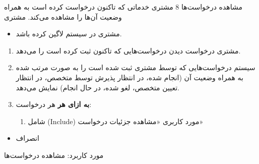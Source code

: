 {
\usecase
{مشاهده درخواست‌ها}
{8}
{مشتری خدماتی که تاکنون درخواست کرده است به همراه وضعیت آن‌ها را مشاهده می‌کند.}
{مشتری}
{}
{	
	\begin{itemize}
		\vspace*{-0.6cm}
		\item 
		مشتری در سیستم لاگین کرده باشد.
	\end{itemize}
}
{
	\vspace*{-0.6cm}
	\begin{enumerate}
		\item
		مشتری درخواست دیدن درخواست‌هایی که تاکنون ثبت کرده است را می‌دهد.
		\item
		سیستم درخواست‌هایی که توسط مشتری ثبت شده است را به صورت مرتب شده به همراه وضعیت آن (انجام شده، در انتظار پذیرش توسط متخصص، در انتظار تعیین متخصص، لغو شده، در حال انجام) نمایش می‌دهد.
		
		\item
		\textbf{به ازای هر} هر درخواست:
		
		\begin{enumerate}[label=\theenumi.\arabic*.]
			\item
			شامل (Include) مورد کاربری «مشاهده جزئیات درخواست»
		\end{enumerate}
	\end{enumerate}
}
{}
{
	\begin{itemize}
		\item
		انصراف
	\end{itemize}
}
{
	مورد کاربرد: مشاهده درخواست‌ها
}

}


